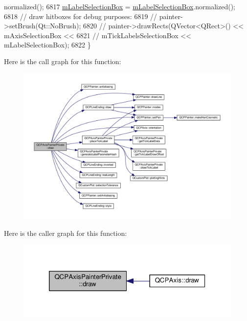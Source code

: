 \begin{DoxyCode}
      normalized();
6817   \hyperlink{class_q_c_p_axis_painter_private_abac9a47048d537f72ca147b6f29d30f1}{mLabelSelectionBox} = \hyperlink{class_q_c_p_axis_painter_private_abac9a47048d537f72ca147b6f29d30f1}{mLabelSelectionBox}.normalized();
6818   \textcolor{comment}{// draw hitboxes for debug purposes:}
6819   \textcolor{comment}{// painter->setBrush(Qt::NoBrush);}
6820   \textcolor{comment}{// painter->drawRects(QVector<QRect>() << mAxisSelectionBox <<}
6821   \textcolor{comment}{// mTickLabelsSelectionBox << mLabelSelectionBox);}
6822 \}
\end{DoxyCode}


Here is the call graph for this function\+:\nopagebreak
\begin{figure}[H]
\begin{center}
\leavevmode
\includegraphics[width=350pt]{class_q_c_p_axis_painter_private_a0207a99bdf9c4f70af20928898ddc2fc_cgraph}
\end{center}
\end{figure}




Here is the caller graph for this function\+:\nopagebreak
\begin{figure}[H]
\begin{center}
\leavevmode
\includegraphics[width=320pt]{class_q_c_p_axis_painter_private_a0207a99bdf9c4f70af20928898ddc2fc_icgraph}
\end{center}
\end{figure}


